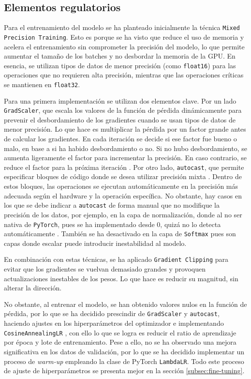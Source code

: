 \documentclass[11pt]{book}
\begin{document}
\subsection{Elementos regulatorios}

Para el entrenamiento del modelo se ha planteado inicialmente la técnica \texttt{Mixed Precision Training}. Esto es porque se ha visto que reduce el uso de memoria y acelera el entrenamiento sin comprometer la precisión del modelo, lo que permite aumentar el tamaño de los batches y no desbordar la memoria de la GPU. En esencia, se utilizan tipos de datos de menor precisión (como \texttt{float16}) para las operaciones que no requieren alta precisión, mientras que las operaciones críticas se mantienen en \texttt{float32}. 

Para una primera implementación se utilizan dos elementos clave. Por un lado \texttt{GradScaler}, que escala los valores de la función de pérdida dinámicamente para prevenir el desbordamiento de los gradientes cuando se usan tipos de datos de menor precisión. Lo que hace es multiplicar la pérdida por un factor grande antes de calcular los gradientes. En cada iteración se decide si ese factor fue bueno o malo, en base a si ha habido desbordamiento o no. Si no hubo desbordamiento, se aumenta ligeramente el factor para incrementar la precisión. En caso contrario, se reduce el factor para la próxima iteración \parencite{amit2024mixedprecision}. Por otro lado, \texttt{autocast}, que permite especificar bloques de código donde se desea utilizar precisión mixta \parencite{stack_overflow_gradscaler}. Dentro de estos bloques, las operaciones se ejecutan automáticamente en la precisión más adecuada según el hardware y la operación específica. No obstante, hay casos en los que se debe indicar a \texttt{autocast} de forma manual que no modifique la precisión de los datos, por ejemplo, en la capa de normalización, donde al no ser nativa de \texttt{PyTorch}, pues se ha implementado desde 0, quizá no lo detecta automáticamente \parencite{amit2024mixedprecision}. También se ha desactivado en la capa de \texttt{Softmax} pues son capas donde escalar puede introducir inestabilidad al modelo.

En combinación con estas técnicas, se ha aplicado \texttt{Gradient Clipping} para evitar que los gradientes se vuelvan demasiado grandes y provoquen actualizaciones inestables de los pesos. Lo que hace es reducir su magnitud, sin alterar la dirección. 


No obstante, al entrenar el modelo, se han obtenido valores nulos en la función de pérdida, por lo que se ha decidido prescindir de \texttt{GradScaler} y \texttt{autocast}, haciendo ajustes en los hiperparámetros del optimizador e implementando \texttt{CosineAnnealingLR} \parencite{pytorch_cosineannealinglr}, con ello lo que se logra es reducir el ratio de aprendizaje por época y lote de entrenamiento. Pese a ello, no se ha observado una mejora significativa en los datos de validación, por lo que se ha decidido implementar un proceso de \textit{warm-up} empleando la clase de PyTorch \texttt{LambdaLR}. Todo este proceso de ajuste de hiperparámetros se presenta mejor en la sección \ref{subsec:fine-tuning}.
\end{document}
